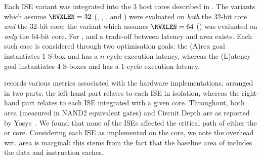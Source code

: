 
Each ISE variant was integrated into the $3$ host cores 
described in .
The variants which assume  $\RVXLEN = 32$
(, , , and ) 
were evaluated
on {\em both} the
$32$-bit  core
{\em  and} the
$32$-bit  core;
the variant  which assumes $\RVXLEN = 64$
()
was  evaluated
on {\em only} the
$64$-bit  core.
For ,  and  a trade-off
between latency and area exists. 
Each such case is considered through two optimisation goals:
the (A)rea    goal
instantiates $1$ S-box   and has a $n$-cycle execution latency,
whereas
the (L)atency goal
instantiates $4$ S-boxes and has a $1$-cycle execution latency.

records
various metrics 
associated with the hardware implementations, 
arranged in two parts: 
the  left-hand part relates to each ISE in isolation,
whereas 
the right-hand part relates to each ISE integrated with a given core.
Throughout, both area (measured in NAND2 equivalent gates) and Circuit
Depth are as reported by Yosys~\cite{yosys}.  We found 
that none of the ISEs affected the critical path of either the  
or  core.
Considering each ISE as implemented on the  core, we note the 
overhead wrt. area is marginal: this stems from the fact that the 
baseline area of  includes the data and instruction caches.

